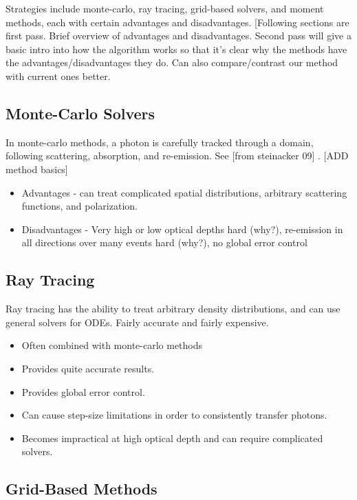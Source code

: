 Strategies include monte-carlo, ray tracing, grid-based solvers, and moment methods, each with certain advantages and disadvantages. [Following sections are first pass. Brief overview of advantages and disadvantages. Second pass will give a basic intro into how the algorithm works so that it's clear why the methods have the advantages/disadvantages they do. Can also compare/contrast our method with current ones better.

\subsection{Monte-Carlo Solvers}
\label{montecarlo}

In monte-carlo methods, a photon is carefully tracked through a domain, following scattering, absorption, and re-emission. See [from steinacker 09] \citet{wolf03,woodEt2004,ercolanoEt2005,jonsson06,pinteEt06}. [ADD method basics]


\begin{itemize}
\item Advantages - can treat complicated spatial distributions, arbitrary scattering functions, and polarization.
\item Disadvantages - Very high or low optical depths hard (why?), re-emission in all directions over many events hard (why?), no global error control
\end{itemize}


\subsection{Ray Tracing}
\label{sec:raytracing}

Ray tracing has the ability to treat arbitrary density distributions, and can use general solvers for ODEs. Fairly accurate and fairly expensive.

\begin{itemize}
\item Often combined with monte-carlo methods
\item Provides quite accurate results.
\item Provides global error control.
\item Can cause step-size limitations in order to consistently transfer photons.
\item Becomes impractical at high optical depth and can require complicated solvers.
\end{itemize}


\subsection{Grid-Based Methods}
\label{sec:gridmethods}

